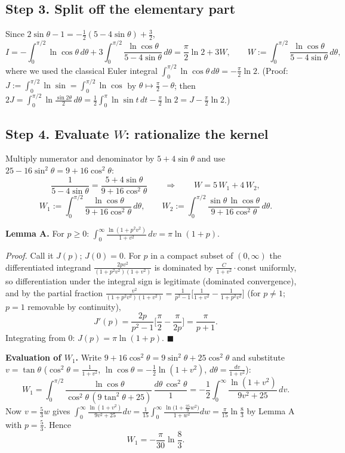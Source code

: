 \documentclass[11pt]{article}
\theoremstyle{remark}
\begin{document}
\subsection*{Step 3. Split off the elementary part}

Since $2\sin\theta-1=-\tfrac12(5-4\sin\theta)+\tfrac32$,
\begin{equation}
I=-\int_0^{\pi/2}\ln\cos\theta\,d\theta+3\int_0^{\pi/2}\frac{\ln\cos\theta}{5-4\sin\theta}\,d\theta
=\frac\pi2\ln2+3W,\qquad W:=\int_0^{\pi/2}\frac{\ln\cos\theta}{5-4\sin\theta}\,d\theta, \tag{4}
\end{equation}
where we used the classical Euler integral $\int_0^{\pi/2}\ln\cos\theta\,d\theta=-\frac\pi2\ln2$. (Proof: $J:=\int_0^{\pi/2}\ln\sin=\int_0^{\pi/2}\ln\cos$ by $\theta\mapsto\frac\pi2-\theta$; then $2J=\int_0^{\pi/2}\ln\frac{\sin2\theta}{2}\,d\theta=\frac12\int_0^{\pi}\ln\sin t\,dt-\frac\pi2\ln2=J-\frac\pi2\ln2$.)

\subsection*{Step 4. Evaluate $W$: rationalize the kernel}

Multiply numerator and denominator by $5+4\sin\theta$ and use $25-16\sin^2\theta=9+16\cos^2\theta$:
\begin{equation}
\frac{1}{5-4\sin\theta}=\frac{5+4\sin\theta}{9+16\cos^2\theta}
\qquad\Longrightarrow\qquad
W=5\,W_1+4\,W_2, \tag{5}
\end{equation}
\[W_1:=\int_0^{\pi/2}\frac{\ln\cos\theta}{9+16\cos^2\theta}\,d\theta,\qquad
W_2:=\int_0^{\pi/2}\frac{\sin\theta\,\ln\cos\theta}{9+16\cos^2\theta}\,d\theta .\]

\textbf{Lemma A.} For $p\ge0$: $\displaystyle\int_0^\infty\frac{\ln(1+p^2v^2)}{1+v^2}\,dv=\pi\ln(1+p).$

\textit{Proof.} Call it $J(p)$; $J(0)=0$. For $p$ in a compact subset of $(0,\infty)$ the differentiated integrand $\frac{2pv^2}{(1+p^2v^2)(1+v^2)}$ is dominated by $\frac{C}{1+v^2}\cdot$const uniformly, so differentiation under the integral sign is legitimate (dominated convergence), and by the partial fraction $\frac{v^2}{(1+p^2v^2)(1+v^2)}=\frac{1}{p^2-1}\big[\frac{1}{1+v^2}-\frac{1}{1+p^2v^2}\big]$ (for $p\neq1$; $p=1$ removable by continuity),
\[J'(p)=\frac{2p}{p^2-1}\Big[\frac\pi2-\frac{\pi}{2p}\Big]=\frac{\pi}{p+1}.\]
Integrating from $0$: $J(p)=\pi\ln(1+p)$. $\blacksquare$

\textbf{Evaluation of $W_1$.} Write $9+16\cos^2\theta=9\sin^2\theta+25\cos^2\theta$ and substitute $v=\tan\theta$ ($\cos^2\theta=\frac{1}{1+v^2}$, $\ln\cos\theta=-\frac12\ln(1+v^2)$, $d\theta=\frac{dv}{1+v^2}$):
\[W_1=\int_0^{\pi/2}\frac{\ln\cos\theta}{\cos^2\theta\,(9\tan^2\theta+25)}\,\frac{d\theta\,\cos^2\theta}{1}
=-\frac12\int_0^\infty\frac{\ln(1+v^2)}{9v^2+25}\,dv .\]
Now $v=\frac53 w$ gives $\int_0^\infty\frac{\ln(1+v^2)}{9v^2+25}dv=\frac{1}{15}\int_0^\infty\frac{\ln\!\big(1+\frac{25}{9}w^2\big)}{1+w^2}dw=\frac{\pi}{15}\ln\frac83$ by Lemma A with $p=\frac53$. Hence
\begin{equation}
W_1=-\frac{\pi}{30}\ln\frac83. \tag{6}
\end{equation}
\end{document}
